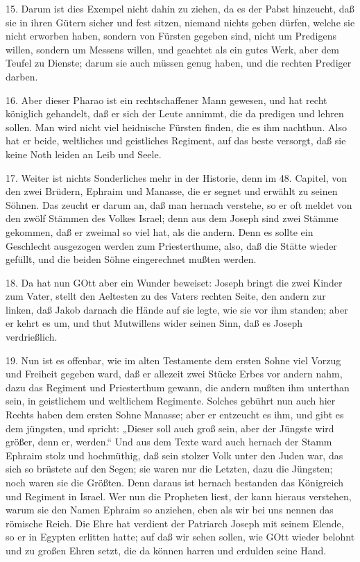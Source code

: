 15. Darum ist dies Exempel nicht dahin zu ziehen, da es der Pabst hinzeucht, daß sie in ihren Gütern sicher und fest sitzen, niemand nichts geben dürfen, welche sie nicht erworben haben, sondern von Fürsten gegeben sind, nicht um Predigens willen, sondern um Messens willen, und geachtet als ein gutes Werk, aber dem Teufel zu Dienste; darum sie auch müssen genug haben, und die rechten Prediger darben.

16. Aber dieser Pharao ist ein rechtschaffener Mann gewesen, und hat recht königlich gehandelt, daß er sich der Leute annimmt, die da predigen und lehren sollen. Man wird nicht viel heidnische Fürsten finden, die es ihm nachthun. Also hat er beide, weltliches und geistliches Regiment, auf das beste versorgt, daß sie keine Noth leiden an Leib und Seele.

17. Weiter ist nichts Sonderliches mehr in der Historie, denn im 48. Capitel, von den zwei Brüdern, Ephraim und Manasse, die er segnet und erwählt zu seinen Söhnen. Das zeucht er darum an, daß man hernach verstehe, so er oft meldet von den zwölf Stämmen des Volkes Israel; denn aus dem Joseph sind zwei Stämme gekommen, daß er zweimal so viel hat, als die andern. Denn es sollte ein Geschlecht ausgezogen werden zum Priesterthume, also, daß die Stätte wieder gefüllt, und die beiden Söhne eingerechnet mußten werden.

18. Da hat nun GOtt aber ein Wunder beweiset: Joseph bringt die zwei Kinder zum Vater, stellt den Aeltesten zu des Vaters rechten Seite, den andern zur linken, daß Jakob darnach die Hände auf sie legte, wie sie vor ihm standen; aber er kehrt es um, und thut Mutwillens wider seinen Sinn, daß es Joseph verdrießlich.

19. Nun ist es offenbar, wie im alten Testamente dem ersten Sohne viel Vorzug und Freiheit gegeben ward, daß er allezeit zwei Stücke Erbes vor andern nahm, dazu das Regiment und Priesterthum gewann, die andern mußten ihm unterthan sein, in geistlichem und weltlichem Regimente. Solches gebührt nun auch hier Rechts haben dem ersten Sohne Manasse; aber er entzeucht es ihm, und gibt es dem jüngsten, und spricht: „Dieser soll auch groß sein, aber der Jüngste wird größer, denn er, werden.“ Und aus dem Texte ward auch hernach der Stamm Ephraim stolz und hochmüthig, daß sein stolzer Volk unter den Juden war, das sich so brüstete auf den Segen; sie waren nur die Letzten, dazu die Jüngsten; noch waren sie die Größten. Denn daraus ist hernach bestanden das Königreich und Regiment in Israel. Wer nun die Propheten liest, der kann hieraus verstehen, warum sie den Namen Ephraim so anziehen, eben als wir bei uns nennen das römische Reich. Die Ehre hat verdient der Patriarch Joseph mit seinem Elende, so er in Egypten erlitten hatte; auf daß wir sehen sollen, wie GOtt wieder belohnt und zu großen Ehren setzt, die da können harren und erdulden seine Hand.

